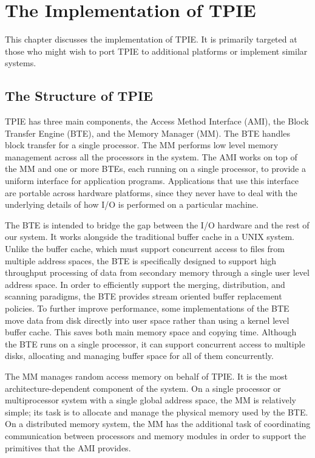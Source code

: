 \chapter{The Implementation of TPIE}

This chapter discusses the implementation of TPIE.  It is primarily
targeted at those who might wish to port TPIE to additional platforms
or implement similar systems.  

\section{The Structure of TPIE}

TPIE has three main components, the Access Method Interface
(AMI), the Block Transfer Engine
(BTE), and the Memory Manager
(MM).  The BTE handles block transfer for a single
processor.  The MM performs low level memory management across all the
processors in the system.  The AMI works on top of the MM and one or more
BTEs, each running on a single processor, to provide a uniform interface
for application programs.  Applications that use this interface are
portable across hardware platforms, since they never have to deal with the
underlying details of how I/O is performed on a particular machine.

The BTE is intended to bridge the gap between the I/O hardware and the
rest of our system.  It works alongside the traditional buffer
cache in a UNIX system.  Unlike the buffer
cache, which must support concurrent access to
files from multiple address spaces, the BTE is specifically designed
to support high throughput processing of data from secondary memory
through a single user level address space.  In order to efficiently
support the merging, distribution, and scanning paradigms, the BTE
provides stream oriented buffer replacement policies.  To further
improve performance, some implementations of the BTE move data from
disk directly into user space rather than using a kernel level buffer
cache.  This saves both main memory space and
copying time.  Although the BTE runs on a single processor, it can
support concurrent access to multiple disks,
allocating and managing buffer space for all of them concurrently.

The MM manages random access memory on behalf of
TPIE.  It is the most architecture-dependent component of the system.
On a single processor or multiprocessor system with a single global
address space, the MM is relatively simple; its task is to allocate
and manage the physical memory used by the BTE.  On a distributed
memory system, the MM has the additional task of coordinating
communication between processors and memory modules in order to
support the primitives that the AMI provides.

